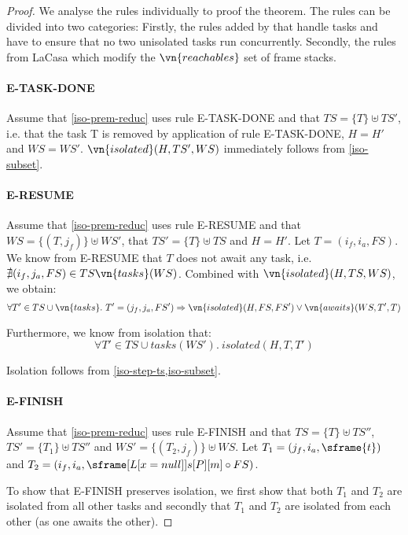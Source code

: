 \begin{proof}
We analyse the rules individually to proof the theorem. The rules can be divided into two categories: Firstly, the rules added by \plc that handle tasks and have to ensure that no two unisolated tasks run concurrently. Secondly, the rules from LaCasa which modify the $\vn{reachables}$ set of frame stacks.

\paragraph{E-TASK-DONE}
Assume that \cref{iso-prem-reduc} uses rule E-TASK-DONE and that $TS = \{T\} \uplus TS'$, i.e. that the task T is removed by application of rule E-TASK-DONE, $H = H'$ and $WS = WS'$. $\vn{isolated}(H, TS', WS)$ immediately follows from \cref{iso-subset}.

\paragraph{E-RESUME}
Assume that \cref{iso-prem-reduc} uses rule E-RESUME and that $WS = \{ (T, j_f) \} \uplus WS'$, that $TS' = \{ T \} \uplus TS$ and $H = H'$. Let $T = (i_f, i_a, FS)$. We know from E-RESUME that $T$ does not await any task, i.e. $\nexists(i_f, j_a, FS) \in TS \vn{tasks}(WS)$. Combined with $\vn{isolated}(H, TS, WS)$, we obtain:
\[
    \forall T' \in TS \cup \vn{tasks}.\ T' = (j_f, j_a, FS') \Rightarrow \vn{isolated}(H, FS, FS') \vee \vn{awaits}(WS, T', T)
\]




Furthermore, we know from isolation that:
\[
    \forall T' \in TS \cup tasks(WS').\ isolated(H, T, T')
\]

Isolation follows from \cref{iso-step-ts,iso-subset}.

\paragraph{E-FINISH}
Assume that \cref{iso-prem-reduc} uses rule E-FINISH and that $TS = \{ T \} \uplus TS''$, $TS' = \{ T_1 \} \uplus TS''$ and $WS' = \{(T_2, j_f)\} \uplus WS$. Let $T_1 = (j_f, i_a, \sframe{t})$ and $T_2 = (i_f, i_a, \sframe[L[x = null]]{s}[P][m] \circ FS)$.

To show that E-FINISH preserves isolation, we first show that both $T_1$ and $T_2$ are isolated from all other tasks and secondly that $T_1$ and $T_2$ are isolated from each other (as one awaits the other).


\end{proof}
